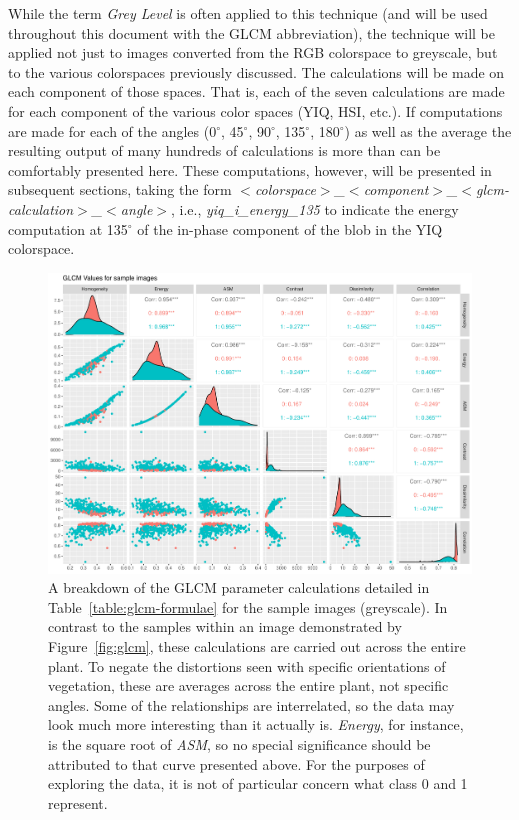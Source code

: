 \documentclass[letterpaper]{article}
\begin{document}
{While the term \textit{Grey Level} is often applied to this technique (and will be used throughout this document with the GLCM abbreviation), the technique will be applied not just to images converted from the RGB colorspace to greyscale, but to the various colorspaces previously discussed. The calculations will be made on each component of those spaces.  That is, each of the seven calculations are made for each component of the various color spaces (YIQ, HSI, etc.). If computations are made for each of the angles (0$^{\circ}$, 45$^{\circ}$, 90$^{\circ}$, 135$^{\circ}$, 180$^{\circ}$) as well as the average the resulting output of many hundreds of calculations is more than can be comfortably presented here. These computations, however, will be presented in subsequent sections, taking the form \textit{$<$colorspace$>$\_$<$component$>$\_$<$glcm-calculation$>$\_$<$angle$>$}, i.e., \textit{yiq\_i\_energy\_135} to indicate the energy computation at 135$^{\circ}$ of the in-phase component of the blob in the YIQ colorspace.

\begin{figure}[H]
	\centering
	\includegraphics[width=0.9\linewidth]{./figures/glcm-pairs.pdf}
	\caption[GLCM parameter correlation assessment]{A breakdown of the GLCM parameter calculations detailed in Table~\ref{table:glcm-formulae} for the sample images (greyscale). In contrast to the samples within an image demonstrated by Figure~\ref{fig:glcm}, these calculations are carried out across the entire plant. To negate the distortions seen with specific orientations of vegetation, these are averages across the entire plant, not specific angles. Some of the relationships are interrelated, so the data may look much more interesting than it actually is. \textit{Energy}, for instance, is the square root of \textit{ASM}, so no special significance should be attributed to that curve presented above. For the purposes of exploring the data, it is not of particular concern what class 0 and 1 represent.}
\end{figure} 

}
\end{document}
